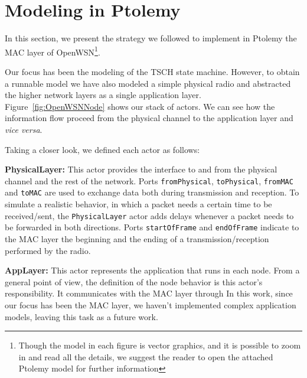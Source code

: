 
\section{Modeling in Ptolemy}
\label{sec:modeling-ptolemy}

In this section, we present the strategy we followed to implement in Ptolemy the MAC layer of OpenWSN\footnote{Though the model in each figure is vector graphics, and it is possible to zoom in and read all the details, we  suggest the reader to open the attached Ptolemy model for further information}.

Our focus has been the modeling of the TSCH state machine. However, to obtain a runnable model we have also modeled a simple physical radio and abstracted the higher network layers as a single application layer. Figure~\ref{fig:OpenWSNNode} shows our stack of actors. We can see how the information flow proceed from the physical channel to the application layer and \emph{vice versa}. 

Taking a closer look, we defined each actor as follows:

{\bf PhysicalLayer:} This actor provides the interface to and from the physical channel and the rest of the network. Ports \texttt{fromPhysical}, \texttt{toPhysical}, \texttt{fromMAC} and \texttt{toMAC} are used to exchange data both during transmission and reception.
To simulate a realistic behavior, in which a packet needs a certain time to be received/sent, the \texttt{PhysicalLayer} actor adds delays whenever a packet needs to be forwarded in both directions. Ports \texttt{startOfFrame} and \texttt{endOfFrame} indicate to the MAC layer the beginning and the ending of a transmission/reception performed by the radio. 

{\bf AppLayer:} This actor represents the application that runs in each node. From a general point of view, the definition of the node behavior is this actor's responsibility. It communicates with the MAC layer through In this work, since our focus has been the MAC layer, we haven't implemented complex application models, leaving this task as a future work. 

